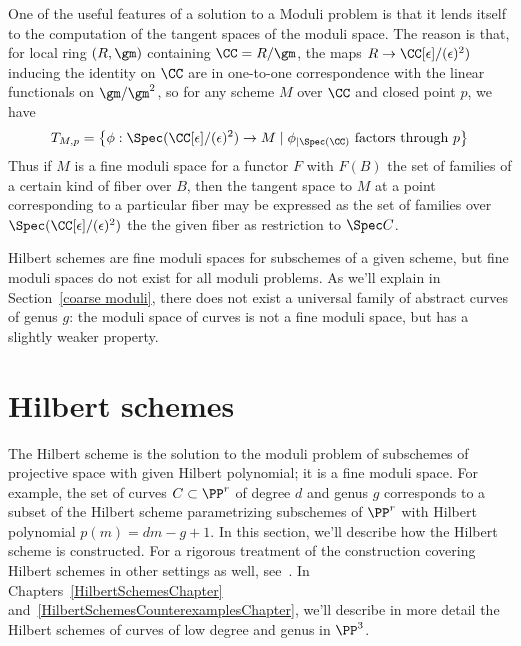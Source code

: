 \def\eps{{\epsilon}}
One of the useful features of a solution to a Moduli problem is that it lends itself to the computation of the tangent spaces
of the moduli space. The reason is that, for local ring $(R,\gm)$ containing $\CC = R/\gm$,
 the maps $R \to \CC[\eps]/(\eps)^2)$ inducing the identity on $\CC$ are in one-to-one correspondence
 with the linear functionals on $\gm/\gm^2$, so for any scheme $M$ over $\CC$ and closed point $p$, we have
$$
T_{M,p} = \bigl\{\phi: \Spec(\CC[\eps]/(\eps)^2) \to M \mid \phi_{|\Spec (\CC)} \hbox{ factors through } p\bigr\}
$$
Thus if $M$ is a fine moduli space for a functor $F$ with $F(B)$ the set of families of a certain kind of fiber over $B$,
 then the tangent space to $M$ at a point corresponding to a particular fiber  may be expressed as the 
 set of families over $\Spec(\CC[\eps]/(\eps)^2)$ the the given fiber as restriction to $\Spec C$. 

Hilbert schemes are fine moduli spaces for subschemes of a given scheme, but 
fine moduli spaces do not exist for all moduli problems. As we'll explain in Section~\ref{coarse moduli}, there does not exist a universal family of abstract curves of genus $g$: the moduli space of curves is
not a fine moduli space, but has a slightly weaker property.

\section{Hilbert schemes}\label{hilbert scheme section}

The Hilbert scheme is the solution to the moduli problem of subschemes of projective space with given Hilbert polynomial; it is a fine moduli space. For example, the set of curves $C \subset \PP^r$ of degree $d$ and genus $g$ corresponds to a subset of the Hilbert scheme parametrizing subschemes of $\PP^r$ with Hilbert polynomial $p(m) = dm - g + 1$. In this section, we'll describe how the Hilbert scheme is constructed. For a rigorous treatment of the construction covering Hilbert
schemes in other settings as well, see~\cite{HomogHilbert}. In Chapters~\ref{HilbertSchemesChapter} and~\ref{HilbertSchemesCounterexamplesChapter}, we'll describe in more detail the Hilbert schemes of curves of low degree and genus in $\PP^3$. 


